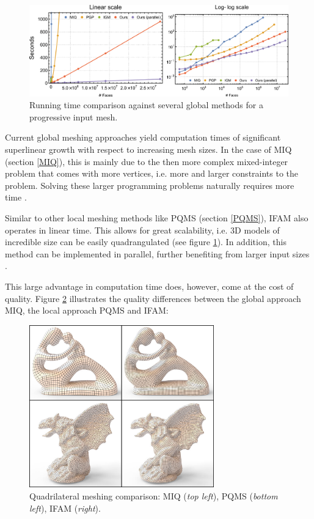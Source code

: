 \documentclass{ACGSeminar}
\begin{document}
\begin{figure}[htb!]
	\begin{centering}
		\includegraphics[width=12cm]{img/computation-time.png}\par
	\end{centering}
	\caption{Running time comparison against several global methods for a progressive input mesh. \cite{jakob2015instant}}
	\label{fig:computation-time}
\end{figure}

Current global meshing approaches yield computation times of significant superlinear growth with respect to increasing mesh sizes. In the case of MIQ (section \ref{MIQ}), this is mainly due to the then more complex mixed-integer problem that comes with more vertices, i.e. more and larger constraints to the problem. Solving these larger programming problems naturally requires more time \cite{jakob2015instant,bommes2009mixed}.

Similar to other local meshing methods like PQMS (section \ref{PQMS}), IFAM also operates in linear time. This allows for great scalability, i.e. 3D models of incredible size can be easily quadrangulated (see figure \ref{fig:computation-time}). In addition, this method can be implemented in parallel, further benefiting from larger input sizes \cite{jakob2015instant}.\bigskip

This large advantage in computation time does, however, come at the cost of quality. Figure \ref{fig:quality} illustrates the quality differences between the global approach MIQ, the local approach PQMS and IFAM:

\begin{figure}[htb!]
	\begin{centering}
		\includegraphics[width=8cm]{img/quality.png}\par
	\end{centering}
	\caption{Quadrilateral meshing comparison: MIQ \cite{bommes2009mixed} (\textit{top left}), PQMS \cite{tarini2010practical} (\textit{bottom left}), IFAM (\textit{right}). \cite{jakob2015instant}}
	\label{fig:quality}
\end{figure}
\end{document}
